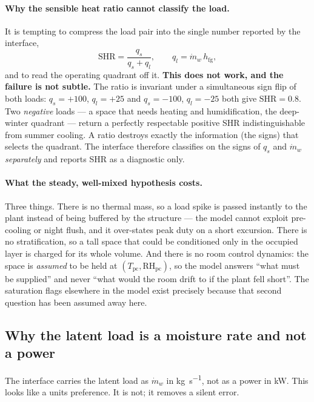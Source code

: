 \documentclass[11pt]{article}
\newcommand{\mdw}{\ensuremath{\dot m_{w}}}
\newcommand{\hfg}{\ensuremath{h_{\mathrm{fg}}}}
\newcommand{\RH}{\ensuremath{\mathrm{RH}}}
\newcommand{\qs}{\ensuremath{q_{s}}}
\newcommand{\ql}{\ensuremath{q_{l}}}
\begin{document}
\paragraph{Why the sensible heat ratio cannot classify the load.} It is
tempting to compress the load pair into the single number reported by the
interface,
\begin{equation}
\mathrm{SHR}=\frac{\qs}{\qs+\ql},\qquad \ql=\mdw\,\hfg ,
\label{eq:dem:shr}
\end{equation}
and to read the operating quadrant off it. \textbf{This does not work, and the
failure is not subtle.} The ratio is invariant under a simultaneous sign flip of
both loads: $\qs=+100$, $\ql=+25$ and $\qs=-100$, $\ql=-25$ both give
$\mathrm{SHR}=0.8$. Two \emph{negative} loads --- a space that needs heating and
humidification, the deep-winter quadrant --- return a perfectly respectable
positive SHR indistinguishable from summer cooling. A ratio destroys exactly the
information (the signs) that selects the quadrant. The interface therefore
classifies on the signs of $\qs$ and $\mdw$ \emph{separately} and reports
SHR as a diagnostic only.

\paragraph{What the steady, well-mixed hypothesis costs.} Three things. There is
no thermal mass, so a load spike is passed instantly to the plant instead of
being buffered by the structure --- the model cannot exploit pre-cooling or
night flush, and it over-states peak duty on a short excursion. There is no
stratification, so a tall space that could be conditioned only in the occupied
layer is charged for its whole volume. And there is no room control dynamics:
the space is \emph{assumed} to be held at
$(T_{\mathrm{pc}},\RH_{\mathrm{pc}})$, so the model answers ``what must be
supplied'' and never ``what would the room drift to if the plant fell short''.
The saturation flags elsewhere in the model exist precisely because that second
question has been assumed away here.

\subsection{Why the latent load is a moisture rate and not a power}
\label{sec:dem:hfg}

The interface carries the latent load as $\mdw$ in \si{\kilogram\per\second}, not
as a power in \si{\kilo\watt}. This looks like a units preference. It is not; it
removes a silent error.
\end{document}

